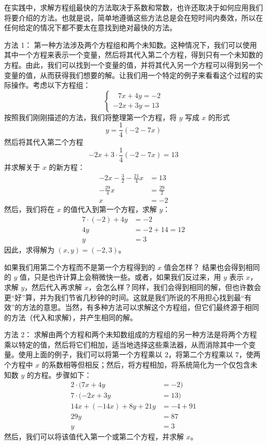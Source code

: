 在实践中，求解方程组最快的方法取决于系数和常数，也许还取决于如何应用我们将要介绍的方法。也就是说，简单地遵循这些方法总是会在短时间内奏效，所以在任何给定的情况下都不要太在意找到绝对最快的方法。

\begin{method}{方法 1：}
    第一种方法涉及两个方程组和两个未知数。这种情况下，我们可以使用其中一个方程来表示一个变量，然后将其代入第二个方程，得到只有一个未知数的方程。由此，我们可以找到一个变量的值，并将其代入另一个方程可以得到另一个变量的值，从而获得我们想要的解。让我们用一个特定的例子来看看这个过程的实际操作。考虑以下方程组：
    $$
    \begin{cases}
        \enspace\: 7x+4y =-2 \\
        -2x+3y =13
    \end{cases}
    $$
    按照我们刚刚描述的方法，我们将整理第一个方程，将 $y$ 写成 $x$ 的形式
    \[y = \frac{1}{4}(-2-7x)\]
    然后将其代入第二个方程
    \[-2x + 3 \cdot \frac{1}{4}(-2 - 7x) = 13\]
    并求解关于 $x$ 的新方程：
    \begin{align*}
        -2x-\frac{3}{2}-\frac{21}{4}x &= 13 \\
        -\frac{29}{4}x &= \frac{29}{2} \\
        x &= -2
    \end{align*}
    然后，我们将在 $x$ 的值代入到第一个方程，求解 $y$：
    \begin{align*}
        7 \cdot (-2) + 4y &= -2 \\
        4y &= -2+14 = 12 \\
        y &= 3
    \end{align*}
    因此，求得解为 $(x, y) = (-2, 3)$。
\end{method}

如果我们用第二个方程而不是第一个方程得到的 $x$ 值会怎样？ 结果也会得到相同的 $y$ 值，只是也许计算上会稍微快一些。或者，如果我们反过来，用 $y$ 表示 $x$，求解 $y$，然后代入再求解 $x$，会怎么样？同样，我们会得到相同的解，但也许数会更“好”算，并为我们节省几秒钟的时间。这就是我们所说的不用担心找到最“有效”的方法的意思。当然，有多种方法可以求解这个方程组，但它们最终源于相同的方法（代入和求解），并产生相同的解。

\begin{method}{方法 2：}
    求解由两个方程和两个未知数组成的方程组的另一种方法是将两个方程乘以特定的值，然后将它们相加，适当地选择这些乘法器，从而消除其中一个变量。使用上面的例子，我们可以将第一个方程乘以 $2$，将第二个方程乘以 $7$，使两个方程中 $x$ 的系数相等但相反；然后，将方程相加，将系统简化为一个仅包含未知数 $y$ 的方程。步骤如下：
    \begin{align*}
        2 \cdot (7x+4y &= -2) \\ 
        7 \cdot (-2x+3y &=13) \\
        14x + (-14x) + 8y + 21y &= -4 + 91 \\
        29y &= 87 \\
        y &= 3
    \end{align*}
    然后，我们可以将该值代入第一个或第二个方程，并求解 $x$。
\end{method}

